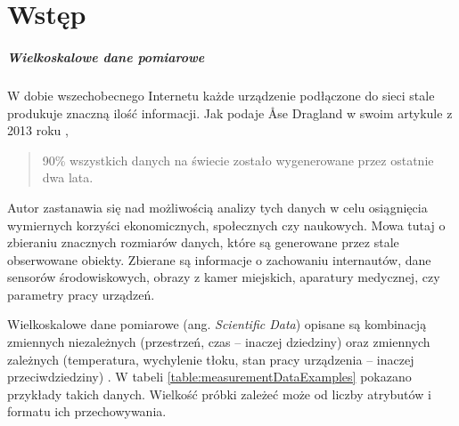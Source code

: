 \chapter{Wst\k{e}p}

\paragraph{Wielkoskalowe dane pomiarowe}

W dobie wszechobecnego Internetu każde urządzenie podłączone do sieci stale produkuje znaczną ilość informacji.
Jak podaje Åse Dragland w swoim artykule z 2013 roku \cite{dragland2013big},
\begin{quote}
	90\% wszystkich danych na świecie zostało wygenerowane przez ostatnie dwa lata.
\end{quote}
Autor zastanawia się nad możliwością analizy tych danych w celu osiągnięcia wymiernych korzyści ekonomicznych, społecznych czy naukowych.
Mowa tutaj o zbieraniu znacznych rozmiarów danych, które są generowane przez stale obserwowane obiekty.
Zbierane są informacje o zachowaniu internautów, dane sensorów środowiskowych, obrazy z kamer miejskich, aparatury medycznej, czy parametry pracy urządzeń.


Wielkoskalowe dane pomiarowe (ang. \textit{Scientific Data}) opisane są kombinacją zmiennych niezależnych (przestrzeń, czas -- inaczej dziedziny) oraz zmiennych zależnych (temperatura, wychylenie tłoku, stan pracy urządzenia -- inaczej przeciwdziedziny) \cite{Hauser12VisTutorial}.
W tabeli \ref{table:measurementDataExamples} pokazano przykłady takich danych.
Wielkość próbki zależeć może od liczby atrybutów i formatu ich przechowywania.


